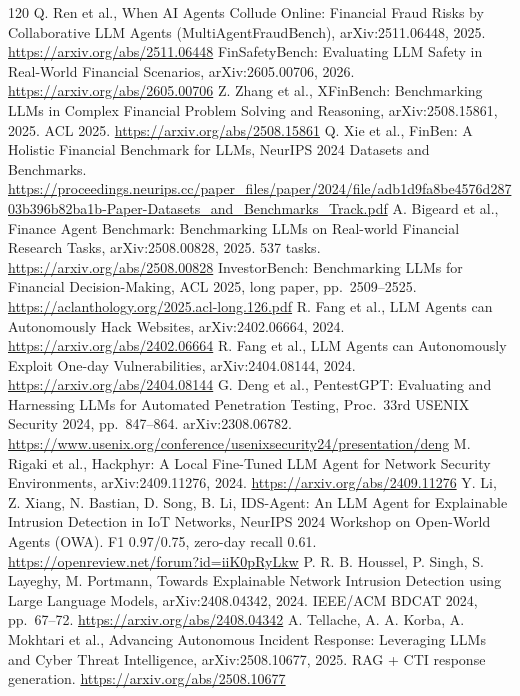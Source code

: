 \documentclass[11pt,a4paper]{article}
\begin{document}
\begin{thebibliography}{120}
 Q. Ren et al., When AI Agents Collude Online: Financial Fraud Risks by Collaborative LLM Agents (MultiAgentFraudBench), arXiv:2511.06448, 2025. \url{https://arxiv.org/abs/2511.06448}
 FinSafetyBench: Evaluating LLM Safety in Real-World Financial Scenarios, arXiv:2605.00706, 2026. \url{https://arxiv.org/abs/2605.00706}
 Z. Zhang et al., XFinBench: Benchmarking LLMs in Complex Financial Problem Solving and Reasoning, arXiv:2508.15861, 2025. ACL 2025. \url{https://arxiv.org/abs/2508.15861}
 Q. Xie et al., FinBen: A Holistic Financial Benchmark for LLMs, NeurIPS 2024 Datasets and Benchmarks. \url{https://proceedings.neurips.cc/paper_files/paper/2024/file/adb1d9fa8be4576d28703b396b82ba1b-Paper-Datasets_and_Benchmarks_Track.pdf}
 A. Bigeard et al., Finance Agent Benchmark: Benchmarking LLMs on Real-world Financial Research Tasks, arXiv:2508.00828, 2025. 537 tasks. \url{https://arxiv.org/abs/2508.00828}
 InvestorBench: Benchmarking LLMs for Financial Decision-Making, ACL 2025, long paper, pp.~2509--2525. \url{https://aclanthology.org/2025.acl-long.126.pdf}
 R. Fang et al., LLM Agents can Autonomously Hack Websites, arXiv:2402.06664, 2024. \url{https://arxiv.org/abs/2402.06664}
 R. Fang et al., LLM Agents can Autonomously Exploit One-day Vulnerabilities, arXiv:2404.08144, 2024. \url{https://arxiv.org/abs/2404.08144}
 G. Deng et al., PentestGPT: Evaluating and Harnessing LLMs for Automated Penetration Testing, Proc.\ 33rd USENIX Security 2024, pp.~847--864. arXiv:2308.06782. \url{https://www.usenix.org/conference/usenixsecurity24/presentation/deng}
 M. Rigaki et al., Hackphyr: A Local Fine-Tuned LLM Agent for Network Security Environments, arXiv:2409.11276, 2024. \url{https://arxiv.org/abs/2409.11276}
 Y. Li, Z. Xiang, N. Bastian, D. Song, B. Li, IDS-Agent: An LLM Agent for Explainable Intrusion Detection in IoT Networks, NeurIPS 2024 Workshop on Open-World Agents (OWA). F1 0.97/0.75, zero-day recall 0.61. \url{https://openreview.net/forum?id=iiK0pRyLkw}
 P. R. B. Houssel, P. Singh, S. Layeghy, M. Portmann, Towards Explainable Network Intrusion Detection using Large Language Models, arXiv:2408.04342, 2024. IEEE/ACM BDCAT 2024, pp.~67--72. \url{https://arxiv.org/abs/2408.04342}
 A. Tellache, A. A. Korba, A. Mokhtari et al., Advancing Autonomous Incident Response: Leveraging LLMs and Cyber Threat Intelligence, arXiv:2508.10677, 2025. RAG + CTI response generation. \url{https://arxiv.org/abs/2508.10677}

\end{thebibliography}
\end{document}
